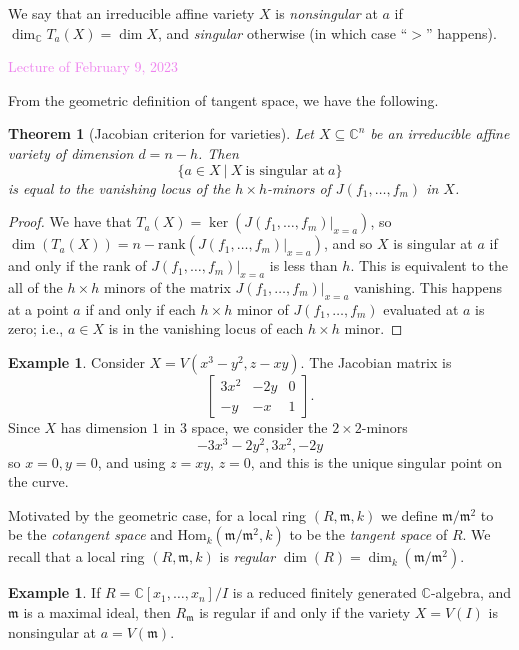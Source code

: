 \documentclass{amsart}[12pt]
\def\ker{\operatorname{ker}}
\newcommand{\Hom}{\mathrm{Hom}}
\newcommand{\Feb}[1]{\textcolor{violet}{Lecture of February #1, 2023}}
\newcommand{\C}{\mathbb{C}}
\newcommand{\fm}{{\mathfrak m}}
\numberwithin{equation}{section}
\theoremstyle{plain} %
\newtheorem{thm}[equation]{Theorem}
\theoremstyle{definition}
\newtheorem{ex}[equation]{Example}
\theoremstyle{remark}
\begin{document}
We say that an irreducible affine variety $X$ is \emph{nonsingular} at $a$ if $\dim_\C T_a(X) = \dim X$, and \emph{singular} otherwise (in which case ``$>$'' happens).

\Feb{9}

From the geometric definition of tangent space, we have the following.

\begin{thm}[Jacobian criterion for varieties] Let $X\subseteq \C^n$ be an irreducible affine variety of dimension $d=n-h$. Then
\[ \{a\in X \ | \ X \ \text{is singular at} \ a\} \]
is equal to the vanishing locus of the $h\times h$-minors of $J(f_1,\dots,f_m)$ in $X$.
\end{thm}
\begin{proof}
We have that $T_a(X)=\ker(J(f_1,\dots,f_m)|_{x=a})$, so $\dim(T_a(X)) = n - \mathrm{rank}(J(f_1,\dots,f_m)|_{x=a})$, and so $X$ is singular at $a$ if and only if the rank of $J(f_1,\dots,f_m)|_{x=a}$ is less than $h$. This is equivalent to the all of the $h\times h$ minors of the matrix $J(f_1,\dots,f_m)|_{x=a}$ vanishing. This happens at a point $a$ if and only if each $h\times h$ minor of $J(f_1,\dots,f_m)$ evaluated at $a$ is zero; i.e., $a\in X$ is in the vanishing locus of each $h\times h$ minor.
\end{proof}

\begin{ex} Consider $X=V(x^3-y^2,z-xy)$. The Jacobian matrix is
\[ \begin{bmatrix} 3x^2 & -2y & 0 \\ -y & -x & 1 \end{bmatrix}.\]
Since $X$ has dimension $1$ in $3$ space, we consider the $2\times 2$-minors
\[ -3x^3 - 2y^2, 3x^2, -2y\]
so $x=0, y=0$, and using $z=xy$, $z=0$, and this is the unique singular point on the curve.
\end{ex}


Motivated by the geometric case, for a local ring $(R,\fm,k)$ we define $\fm/\fm^2$ to be the \emph{cotangent space} and $\Hom_k(\fm/\fm^2,k)$ to be the \emph{tangent space} of $R$. We recall that a local ring $(R,\fm,k)$ is \emph{regular} $\dim(R) = \dim_k(\fm/\fm^2)$.

\begin{ex}
If $R=\C[x_1,\dots,x_n]/I$ is a reduced finitely generated $\C$-algebra, and $\fm$ is a maximal ideal, then $R_{\fm}$ is regular if and only if the variety $X=V(I)$ is nonsingular at $a=V(\fm)$. 
\end{ex}
\end{document}
